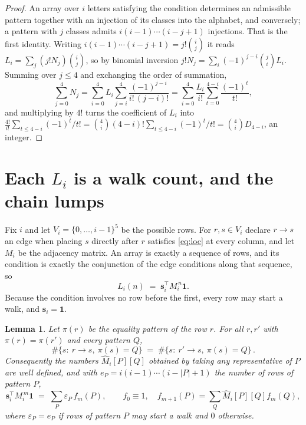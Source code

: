 \documentclass[11pt,a4paper]{article}
\theoremstyle{plain}
\newtheorem{lemma}[theorem]{Lemma}
\theoremstyle{definition}
\begin{document}
\begin{proof}
An array over $i$ letters satisfying the condition determines an admissible pattern together
with an injection of its classes into the alphabet, and conversely; a pattern with $j$
classes admits $i(i-1)\cdots(i-j+1)$ injections. That is the first identity. Writing
$i(i-1)\cdots(i-j+1)=j!\binom{i}{j}$ it reads $L_i=\sum_j (j!N_j)\binom{i}{j}$, so by
binomial inversion $j!N_j=\sum_{i}(-1)^{j-i}\binom{j}{i}L_i$. Summing over
$j\le 4$ and exchanging the order of summation,
\[
\sum_{j=0}^{4}N_j=\sum_{i=0}^{4}L_i\sum_{j=i}^{4}\frac{(-1)^{j-i}}{i!\,(j-i)!}
=\sum_{i=0}^{4}\frac{L_i}{i!}\sum_{t=0}^{4-i}\frac{(-1)^t}{t!} ,
\]
and multiplying by $4!$ turns the coefficient of $L_i$ into
$\frac{4!}{i!}\sum_{t\le 4-i}(-1)^t/t!=\binom{4}{i}(4-i)!\sum_{t\le 4-i}(-1)^t/t!
=\binom{4}{i}D_{4-i}$, an integer.
\end{proof}

\section{Each $L_i$ is a walk count, and the chain lumps}

Fix $i$ and let $V_i=\{0,\dots,i-1\}^{5}$ be the possible rows. For $r,s\in V_i$
declare $r\to s$ an edge when placing $s$ directly after $r$ satisfies \eqref{eq:loc} at
every column, and let $M_i$ be the adjacency matrix. An array is exactly a sequence of
rows, and its condition is exactly the conjunction of the edge conditions along that
sequence, so
\[
L_i(n)\;=\;\mathbf{s}_i^{\!\top}M_i^{\,n}\mathbf{1} .
\]
Because the condition involves no row before the first, every
row may start a walk, and $\mathbf{s}_i=\mathbf{1}$.

\begin{lemma}\label{lem:lump}
Let $\pi(r)$ be the equality pattern of the row $r$. For all $r,r'$ with
$\pi(r)=\pi(r')$ and every pattern $Q$,
\[
\#\{s:\ r\to s,\ \pi(s)=Q\}\;=\;\#\{s:\ r'\to s,\ \pi(s)=Q\}\, .
\]
Consequently the numbers $\widehat M_i[P][Q]$ obtained by taking any representative of $P$
are well defined, and with $e_P=i(i-1)\cdots(i-|P|+1)$ the number of rows of pattern $P$,
\[
\mathbf{s}_i^{\!\top}M_i^{\,m}\mathbf{1}\;=\;\sum_P \varepsilon_P\,f_m(P),
\qquad f_0\equiv1,\quad f_{m+1}(P)=\sum_Q\widehat M_i[P][Q]f_m(Q),
\]
where $\varepsilon_P=e_P$ if rows of pattern $P$ may start a walk and $0$ otherwise.
\end{lemma}
\end{document}
